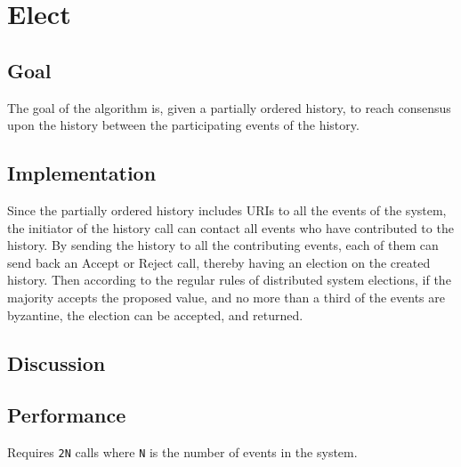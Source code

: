\section{Elect}
\subsection{Goal} %
The goal of the algorithm is, given a partially ordered history, to reach consensus upon the history between the participating events of the history.

\subsection{Implementation}
Since the partially ordered history includes URIs to all the events of the system, the initiator of the history call can contact all events who have contributed to the history. By sending the history to all the contributing events, each of them can send back an Accept or Reject call, thereby having an election on the created history. Then according to the regular rules of distributed system elections, if the majority accepts the proposed value, and no more than a third of the events are byzantine, the election can be accepted, and returned.

\subsection{Discussion} %
\subsection{Performance}
Requires \texttt{2N} calls where \texttt{N} is the number of events in the system.

